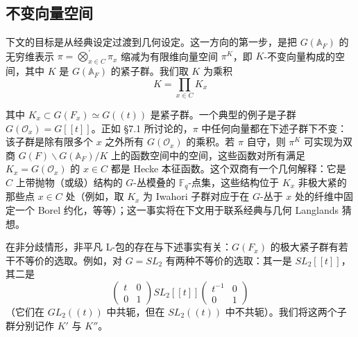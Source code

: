 \subsection{不变向量空间}

下文的目标是从经典设定过渡到几何设定。这一方向的第一步，是把 $G(\mathbb{A}_F)$ 的无穷维表示 $\pi=\bigotimes_{x\in C}^{\prime}\pi_x$ 缩减为有限维向量空间 $\pi^K$，即 $K$-不变向量构成的空间，其中 $K$ 是 $G(\mathbb{A}_F)$ 的紧子群。我们取 $K$ 为乘积
\[
K=\prod_{x\in C}K_x
\]


其中 $K_x\subset G(F_x)\simeq G((t))$ 是紧子群。一个典型的例子是子群 $G(\mathcal{O}_x)=G[[t]]$。正如 §7.1 所讨论的，$\pi$ 中任何向量都在下述子群下不变：该子群是除有限多个 $x$ 之外所有 $G(\mathcal{O}_x)$ 的乘积。若 $\pi$ 自守，则 $\pi^K$ 可实现为双商 $G(F)\backslash G(\mathbb{A}_F)/K$ 上的函数空间中的空间，这些函数对所有满足 $K_x=G(\mathcal{O}_x)$ 的 $x\in C$ 都是 Hecke 本征函数。这个双商有一个几何解释：它是 $C$ 上带抛物（或级）结构的 $G$-丛模叠的 $\mathbb{F}_q$-点集，这些结构位于 $K_x$ 非极大紧的那些点 $x\in C$ 处（例如，取 $K_x$ 为 Iwahori 子群对应于在 $G$-丛于 $x$ 处的纤维中固定一个 Borel 约化，等等）；这一事实将在下文用于联系经典与几何 Langlands 猜想。

在非分歧情形，非平凡 L-包的存在与下述事实有关：$G(F_x)$ 的极大紧子群有若干不等价的选取。例如，对 $G=SL_2$ 有两种不等价的选取：其一是 $SL_2[[t]]$，其二是
\begin{equation}\tag{7.7}
\begin{pmatrix}t&0\\ 0&1\end{pmatrix}SL_2[[t]]\begin{pmatrix}t^{-1}&0\\ 0&1\end{pmatrix}
\end{equation}
（它们在 $GL_2((t))$ 中共轭，但在 $SL_2((t))$ 中不共轭）。我们将这两个子群分别记作 $K'$ 与 $K''$。

